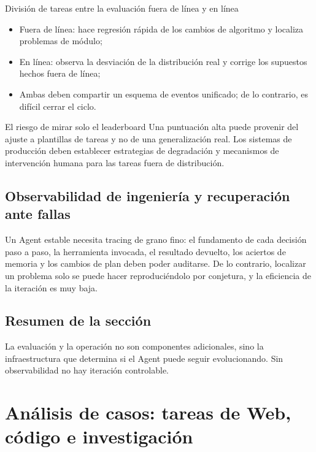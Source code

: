 \documentclass[a4paper]{article}
\begin{document}
\begin{knowledgebox}{División de tareas entre la evaluación fuera de línea y en línea}
\begin{itemize}
    \item Fuera de línea: hace regresión rápida de los cambios de algoritmo y localiza problemas de módulo;
    \item En línea: observa la desviación de la distribución real y corrige los supuestos hechos fuera de línea;
    \item Ambas deben compartir un esquema de eventos unificado; de lo contrario, es difícil cerrar el ciclo.
\end{itemize}
\end{knowledgebox}

\begin{warningbox}{El riesgo de mirar solo el leaderboard}
Una puntuación alta puede provenir del ajuste a plantillas de tareas y no de una generalización real. Los sistemas de producción deben establecer estrategias de degradación y mecanismos de intervención humana para las tareas fuera de distribución.
\end{warningbox}

\subsection{Observabilidad de ingeniería y recuperación ante fallas}
Un Agent estable necesita tracing de grano fino: el fundamento de cada decisión paso a paso, la herramienta invocada, el resultado devuelto, los aciertos de memoria y los cambios de plan deben poder auditarse. De lo contrario, localizar un problema solo se puede hacer reproduciéndolo por conjetura, y la eficiencia de la iteración es muy baja.

\subsection{Resumen de la sección}
La evaluación y la operación no son componentes adicionales, sino la infraestructura que determina si el Agent puede seguir evolucionando. Sin observabilidad no hay iteración controlable.

\section{Análisis de casos: tareas de Web, código e investigación}
\end{document}
